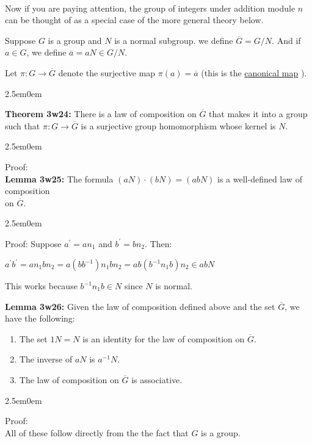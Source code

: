 \documentclass{book}
\newcommand{\hTwo}{%
\color{MidnightBlue}%
   \fontsize{13}{15}\selectfont%
}
\newcommand{\hThree}{%
   \color{PineGreen!85!Orange}
   \fontsize{12}{14}\selectfont%
}
\newcommand{\hFour}{%
   \color{Cyan!80!black}
   \fontsize{12}{14}\selectfont%
}
\newenvironment{myIndent}{%
   \begin{adjustwidth}{2.5em}{0em}%
}{%
   \end{adjustwidth}%
}
\newcommand{\udefine}[1]{{%
   \setulcolor{Red}%
   \setul{0.14em}{0.07em}%
   \ul{#1}%
}}
\newcommand{\blab}[1]{\textbf{#1}}
\newcommand{\mySepTwo}[1][.]{%
   {\noindent\color{#1}{\rule{6.5in}{0.5mm}}}\\%
}
\newcommand{\retTwo}{\hfill\bigbreak}
\begin{document}
\mySepTwo

Now if you are paying attention, the group of integers under addition module $n$ can be thought of as a special case of the more general theory below.\retTwo

Suppose $G$ is a group and $N$ is a normal subgroup. we define $\overline{G} = G / N$. And if $a \in G$, we define $\overline{a} = aN \in G / N$.\retTwo

Let $\pi: G \longrightarrow \overline{G}$ denote the surjective map $\pi(a) = \overline{a}$ (this is the \udefine{canonical map}).

\begin{myIndent}\hTwo
	\blab{Theorem 3w24:} There is a law of composition on $\overline{G}$ that makes it into a group such that $\pi: G \longrightarrow \overline{G}$ is a surjective group homomorphism whose kernel is $N$.

	\begin{myIndent}\hThree
		Proof:\\
		\blab{Lemma 3w25:} The formula $(aN)\cdot(bN) = (abN)$ is a well-defined law of composition\\ on $\overline{G}$.
		
		\begin{myIndent}\hFour
			Proof:
			Suppose $a^\prime = an_1$ and $b^\prime = bn_2$. Then:

			{\centering $a^\prime b^\prime = an_1bn_2 = a(bb^{-1})n_1bn_2 = ab(b^{-1}n_1b)n_2 \in abN$ \retTwo\par}

			This works because $b^{-1}n_1b \in N$ since $N$ is normal.\retTwo
		\end{myIndent}

		\blab{Lemma 3w26:} Given the law of composition defined above and the set $\overline{G}$, we have the following:
		\begin{enumerate}
			\item The set $1N = N$ is an identity for the law of composition on $\overline{G}$.
			\item The inverse of $aN$ is $a^{-1}N$.
			\item The law of composition on $\overline{G}$ is associative.
		\end{enumerate}

		\begin{myIndent}\hFour
			Proof:\\
			All of these follow directly from the the fact that $G$ is a group.\retTwo
		\end{myIndent}


\end{myIndent}
\end{myIndent}
\end{document}
